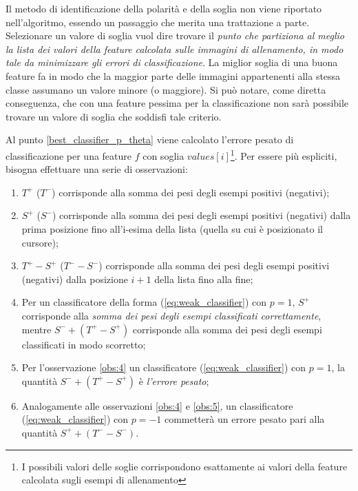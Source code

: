             Il metodo di identificazione della polarità e della soglia non viene riportato nell'algoritmo, essendo un passaggio che merita una trattazione a parte. Selezionare un valore di soglia vuol dire trovare il \emph{punto che partiziona al meglio la lista dei valori della feature calcolata sulle immagini di allenamento, in modo tale da minimizzare gli errori di classificazione}. La miglior soglia di una buona feature fa in modo che la maggior parte delle immagini appartenenti alla stessa classe assumano un valore minore (o maggiore). Si può notare, come diretta conseguenza, che con una feature pessima per la classificazione non sarà possibile trovare un valore di soglia che soddisfi tale criterio.

            Al punto \ref{best_classifier_p_theta} viene calcolato l'errore pesato di classificazione per una feature $f$ con soglia $values[i]$\footnote{I possibili valori delle soglie corrispondono esattamente ai valori della feature calcolata sugli esempi di allenamento}. Per essere più espliciti, bisogna effettuare una serie di osservazioni:
            \begin{enumerate}
                \item \label{obs:1} $T^+$ ($T^-$) corrisponde alla somma dei pesi degli esempi positivi (negativi);
                \item \label{obs:2} $S^+$ ($S^-$) corrisponde alla somma dei pesi degli esempi positivi (negativi) dalla prima posizione fino all'i-esima della lista (quella su cui è posizionato il cursore);
                \item \label{obs:3} $T^+ - S^+$ ($T^- - S^-$) corrisponde alla somma dei pesi degli esempi positivi (negativi) dalla posizione $i+1$ della lista fino alla fine;
                \item \label{obs:4} Per un classificatore della forma (\ref{eq:weak_classifier}) con $p = 1$, $S^+$ corrisponde alla \emph{somma dei pesi degli esempi classificati correttamente}, mentre $S^- + (T^+ - S^+)$ corrisponde alla somma dei pesi degli esempi classificati in modo scorretto;
                \item \label{obs:5} Per l'osservazione \ref{obs:4} un classificatore (\ref{eq:weak_classifier}) con $p = 1$, la quantità $S^- + (T^+ - S^+)$ è \emph{l'errore pesato};
                \item \label{obs:6} Analogamente alle osservazioni \ref{obs:4} e \ref{obs:5}, un classificatore (\ref{eq:weak_classifier}) con $p = -1$ commetterà un errore pesato pari alla quantità $S^+ + (T^- - S^-)$.
            \end{enumerate}

